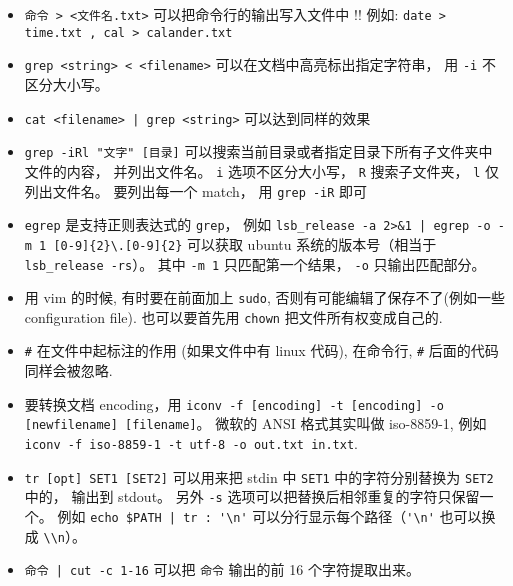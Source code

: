 \begin{itemize}
\item \verb`命令 > <文件名.txt>` 可以把命令行的输出写入文件中 !! 例如: \verb`date > time.txt , cal > calander.txt`
\item \verb`grep <string> < <filename>` 可以在文档中高亮标出指定字符串， 用 \verb|-i| 不区分大小写。
\item \verb`cat <filename> | grep <string>` 可以达到同样的效果
\item \verb`grep -iRl "文字" [目录]` 可以搜索当前目录或者指定目录下所有子文件夹中文件的内容， 并列出文件名。 \verb`i` 选项不区分大小写， \verb`R` 搜索子文件夹， \verb`l` 仅列出文件名。 要列出每一个 match， 用 \verb`grep -iR` 即可
\item \verb|egrep| 是支持正则表达式的 \verb|grep|， 例如 \verb`lsb_release -a 2>&1 | egrep -o -m 1 [0-9]{2}\.[0-9]{2}` 可以获取 ubuntu 系统的版本号（相当于 \verb|lsb_release -rs|）。 其中 \verb|-m 1| 只匹配第一个结果， \verb|-o| 只输出匹配部分。
\item 用 vim 的时候, 有时要在前面加上 \verb`sudo`, 否则有可能编辑了保存不了(例如一些 configuration file). 也可以要首先用 \verb`chown` 把文件所有权变成自己的.
\item \verb`#` 在文件中起标注的作用 (如果文件中有 linux 代码), 在命令行, \verb`#` 后面的代码同样会被忽略.
\item 要转换文档 encoding，用 \verb|iconv -f [encoding] -t [encoding] -o [newfilename] [filename]|。 微软的 ANSI 格式其实叫做 iso-8859-1, 例如 \verb`iconv -f iso-8859-1 -t utf-8 -o out.txt in.txt`.
\item \verb|tr [opt] SET1 [SET2]| 可以用来把 stdin 中 \verb|SET1| 中的字符分别替换为 \verb|SET2| 中的， 输出到 stdout。 另外 \verb|-s| 选项可以把替换后相邻重复的字符只保留一个。 例如 \verb`echo $PATH | tr : '\n'` 可以分行显示每个路径（\verb|'\n'| 也可以换成 \verb|\\n|）。
\item \verb`命令 | cut -c 1-16` 可以把 \verb|命令| 输出的前 16 个字符提取出来。
\end{itemize}

